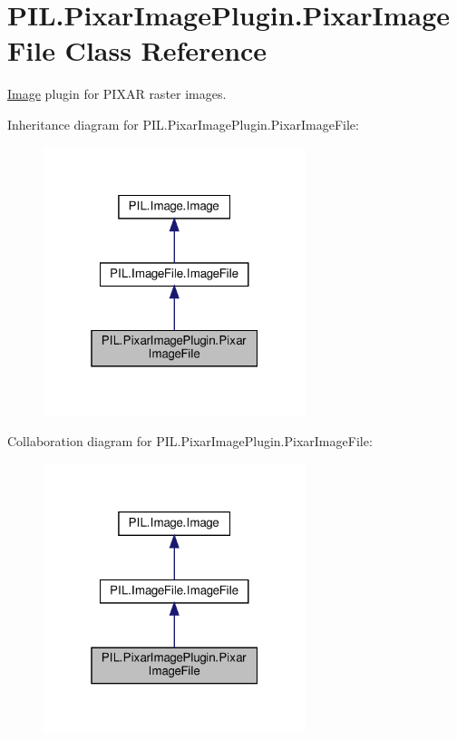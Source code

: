 \hypertarget{classPIL_1_1PixarImagePlugin_1_1PixarImageFile}{}\section{P\+I\+L.\+Pixar\+Image\+Plugin.\+Pixar\+Image\+File Class Reference}
\label{classPIL_1_1PixarImagePlugin_1_1PixarImageFile}


\hyperlink{namespacePIL_1_1Image}{Image} plugin for P\+I\+X\+AR raster images.  




Inheritance diagram for P\+I\+L.\+Pixar\+Image\+Plugin.\+Pixar\+Image\+File\+:
\nopagebreak
\begin{figure}[H]
\begin{center}
\leavevmode
\includegraphics[width=217pt]{classPIL_1_1PixarImagePlugin_1_1PixarImageFile__inherit__graph}
\end{center}
\end{figure}


Collaboration diagram for P\+I\+L.\+Pixar\+Image\+Plugin.\+Pixar\+Image\+File\+:
\nopagebreak
\begin{figure}[H]
\begin{center}
\leavevmode
\includegraphics[width=217pt]{classPIL_1_1PixarImagePlugin_1_1PixarImageFile__coll__graph}
\end{center}
\end{figure}
